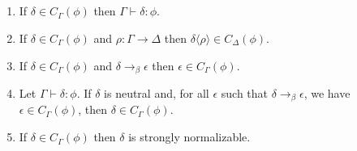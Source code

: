 \begin{code}%
\> \AgdaSymbol{:}  \AgdaSymbol{\{}\AgdaSymbol{\}}           \<%
\\
\>  \AgdaSymbol{(}  \AgdaSymbol{)}  \AgdaSymbol{=}        \<%
\\
\>  \AgdaSymbol{(}  \AgdaSymbol{(}    \AgdaSymbol{))}  \AgdaSymbol{=}     \AgdaSymbol{(}  \AgdaSymbol{)}     \<[61]%
\>[61]\<%
\\
\>[0]\<[2]%
\>[2]  \AgdaSymbol{\{} \AgdaSymbol{:}  \AgdaSymbol{\}}          \<[42]%
\>[42]\<%
\\
\>[2]\<[4]%
\>[4]        \AgdaSymbol{(} \AgdaSymbol{(}   \AgdaSymbol{)} \AgdaSymbol{))}\<%
\end{code}

\begin{lemma}$ $
\begin{enumerate}
\item
If $\delta \in C_\Gamma(\phi)$ then $\Gamma \vdash \delta : \phi$.
\item
If $\delta \in C_\Gamma(\phi)$ and $\rho : \Gamma \rightarrow \Delta$ then $\delta \langle \rho \rangle \in C_\Delta(\phi)$.
\item
If $\delta \in C_\Gamma(\phi)$ and $\delta \rightarrow_\beta \epsilon$ then $\epsilon \in C_\Gamma(\phi)$.
\item
Let $\Gamma \vdash \delta : \phi$.  
If $\delta$ is neutral and, for all $\epsilon$ such that $\delta \rightarrow_\beta \epsilon$, we have $\epsilon \in C_\Gamma(\phi)$, then $\delta \in C_\Gamma(\phi)$.
\item
If $\delta \in C_\Gamma(\phi)$ then $\delta$ is strongly normalizable.
\end{enumerate}
\end{lemma}

